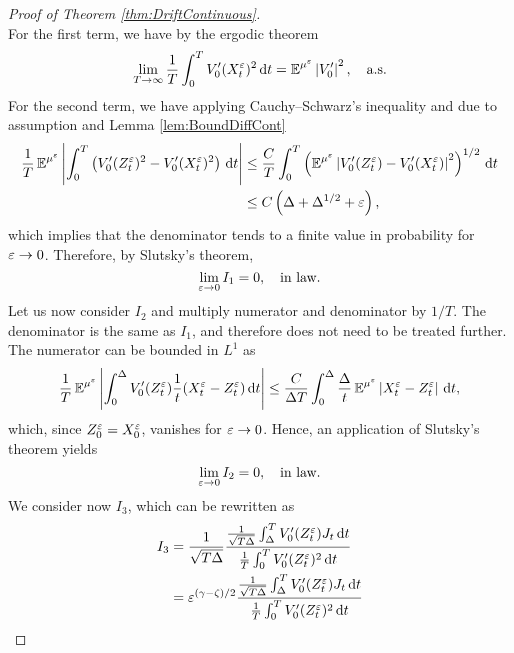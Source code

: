 \documentclass[10pt]{article}
\begin{document}
\begin{proof}[Proof of Theorem \ref{thm:DriftContinuous}]
\begin{equation}
	\end{equation} 
	For the first term, we have by the ergodic theorem
	\begin{equation}
		\lim_{T\to\infty}\frac1T \int_0^T V_0'(X^\varepsilon_t)^2 \,\mathrm{d} t = \operatorname{\mathbb{E}}^{\mu^\varepsilon} \left\lvert V_0'\right\rvert^2, \quad \text{a.s.}
	\end{equation}
	For the second term, we have applying Cauchy--Schwarz's inequality and due to assumption  and Lemma \ref{lem:BoundDiffCont}
	\begin{equation}
	\begin{aligned}
		\frac1T \operatorname{\mathbb{E}}^{\mu^\varepsilon} \left\lvert\int_0^T \left(V_0'(Z^\varepsilon_t)^2 - V_0'(X^\varepsilon_t)^2 \right) \,\mathrm{d} t\right\rvert &\leq \frac{C}{T} \int_0^T \left(\operatorname{\mathbb{E}}^{\mu^\varepsilon} \left\lvert V_0'(Z^\varepsilon_t) - V_0'(X^\varepsilon_t)\right\rvert^2\right)^{1/2}\,\mathrm{d} t\\
		&\leq C \left(\Delta + \Delta^{1/2} + \varepsilon\right),
	\end{aligned}
	\end{equation}
	which implies that the denominator tends to a finite value in probability for $\varepsilon \to 0$. Therefore, by Slutsky's theorem,
	\begin{equation}
		\lim_{\varepsilon \to 0} I_1 = 0, \quad \text{in law}.
	\end{equation}
	Let us now consider $I_2$ and multiply numerator and denominator by $1/T$. The denominator is the same as $I_1$, and therefore does not need to be treated further. The numerator can be bounded in $L^1$ as
	\begin{equation}
	\frac1T \operatorname{\mathbb{E}}^{\mu^\varepsilon}\left\lvert\int_0^\Delta V_0'(Z^\varepsilon_t) \frac1t (X^\varepsilon_t - Z^\varepsilon_t) \,\mathrm{d} t\right\rvert \leq \frac{C}{\Delta T} \int_0^\Delta \frac{\Delta}{t}\operatorname{\mathbb{E}}^{\mu^\varepsilon}\left\lvert X^\varepsilon_t - Z^\varepsilon_t\right\rvert \,\mathrm{d} t,
	\end{equation}
	which, since $Z_0^\varepsilon = X_0^\varepsilon$, vanishes for $\varepsilon \to 0$. Hence, an application of Slutsky's theorem yields
	\begin{equation}
		\lim_{\varepsilon \to 0} I_2 = 0, \quad \text{in law}.
	\end{equation}
	We consider now $I_3$, which can be rewritten as
	\begin{equation}
	\begin{aligned}
		I_3 &= \frac{1}{\sqrt{T\Delta}}\frac{\frac{1}{\sqrt{T\Delta}}\int_\Delta^T V_0'(Z^\epl_t) J_t \dd t}{\frac1T\int_0^T V_0'(Z^\epl_t)^2 \dd t} \\
		&= \epl^{(\gamma - \zeta)/2}\frac{\frac{1}{\sqrt{T\Delta}}\int_\Delta^T V_0'(Z^\epl_t) J_t \dd t}{\frac1T\int_0^T V_0'(Z^\epl_t)^2 \dd t}
	\end{aligned}

\end{equation}
\end{proof}
\end{document}
